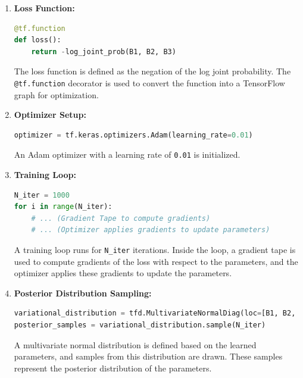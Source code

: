 \documentclass{article}
\begin{document}
\begin{enumerate}
    \item \textbf{Loss Function:}
\begin{lstlisting}[language=Python, caption={Loss Function}, label={lst:loss_function}]
@tf.function
def loss():
    return -log_joint_prob(B1, B2, B3)
\end{lstlisting}
The loss function is defined as the negation of the log joint probability. The \texttt{@tf.function} decorator is used to convert the function into a TensorFlow graph for optimization.

    \item \textbf{Optimizer Setup:}
\begin{lstlisting}[language=Python, caption={Optimizer Setup}, label={lst:optimizer_setup}]
optimizer = tf.keras.optimizers.Adam(learning_rate=0.01)
\end{lstlisting}
An Adam optimizer with a learning rate of \texttt{0.01} is initialized.

    \item \textbf{Training Loop:}
\begin{lstlisting}[language=Python, caption={Training Loop}, label={lst:training_loop}]
N_iter = 1000
for i in range(N_iter):
    # ... (Gradient Tape to compute gradients)
    # ... (Optimizer applies gradients to update parameters)
\end{lstlisting}
A training loop runs for \texttt{N\_iter} iterations. Inside the loop, a gradient tape is used to compute gradients of the loss with respect to the parameters, and the optimizer applies these gradients to update the parameters.

    \item \textbf{Posterior Distribution Sampling:}
\begin{lstlisting}[language=Python, caption={Posterior Distribution Sampling}, label={lst:posterior_sampling}]
variational_distribution = tfd.MultivariateNormalDiag(loc=[B1, B2, B3], scale_diag=[1.0, 1.0, 1.0])
posterior_samples = variational_distribution.sample(N_iter)
\end{lstlisting}
A multivariate normal distribution is defined based on the learned parameters, and samples from this distribution are drawn. These samples represent the posterior distribution of the parameters.
\end{enumerate}
\end{document}
